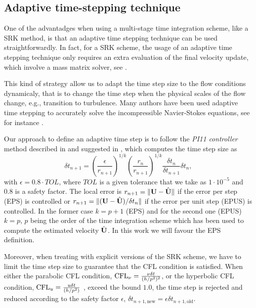\subsection{Adaptive time-stepping technique}
\label{subsec-C7_adaptive}
One of the advantadges when using a multi-stage time integration scheme, like a SRK method, is that an adaptive time stepping technique can be used straightforwardly. In fact, for a SRK scheme, the usage of an adaptive time stepping technique only requires an extra evaluation of the final velocity update, which involve a mass matrix solver, see \cite{gustafsson_control_1991,gustafsson_control-theoretic_1994}.

This kind of strategy allow us to adapt the time step size to the flow conditions dynamicaly, that is to change the time step when the physical scales of the flow change, e.g., transition to turbulence. Many authors have been used adaptive time stepping to accurately solve the incompressible Navier-Stokes equations, see for instance \cite{feng_time-adaptive_2000,john_adaptive_2010,kay_adaptive_2010,veneziani_aladins:_2013}.

Our approach to define an adaptive time step is to follow the \textit{PI11 controller} method described in \cite{soderlind_automatic_2002} and suggested in \cite{gustafsson_control-theoretic_1994}, which computes the time step size as
$$\delta t_{n+1}=\left(\frac{\epsilon}{r_{n+1}}\right)^{1/k}\left(\frac{r_n}{r_{n+1}}\right)^{1/k}\frac{\delta t_n}{\delta t_{n+1}}\delta t_n,$$
with $\epsilon=0.8\cdot TOL$, where $TOL$ is a given tolerance that we take as $1\cdot10^{-5}$ and $0.8$ is a safety factor. The local error is $r_{n+1}=\|{\bf U}-\hat{{\bf U}}\|$ if the error per step (EPS) is controlled or $r_{n+1}=\|({\bf U}-\hat{{\bf U}})/\delta t_n\|$ if the error per unit step (EPUS) is controlled. In the former case $k=p+1$ (EPS) and for the second one (EPUS) $k=p$, $p$ being the order of the time integration scheme which has been used to compute the estimated velocity $\hat{{\bf U}}$. In this work we will favour the EPS definition.

Moreover, when treating with explicit versions of the SRK scheme, we have to limit the time step size to guarantee that the CFL condition is satisfied. When either the parabolic CFL condition, ${\rm CFL}_\nu=\frac{\nu\delta t}{(h/p^2)^2}$, or the hyperbolic CFL condition, ${\rm CFL}_u =\frac{u\delta t}{(h/p^2)}$ , exceed the bound $ 1.0 $, the time step is rejected and reduced according to the safety factor $ \epsilon $, $ \delta t_{n+1,\mbox{new}}=\epsilon\delta t_{n+1,\mbox{old}} $.

